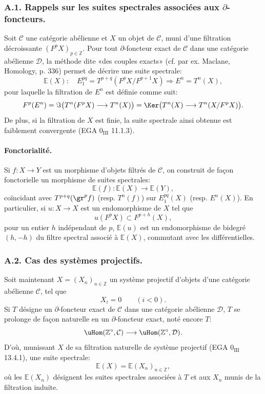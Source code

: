 \subsubsection*{A.1. Rappels sur les suites spectrales associées aux \(\partial\)-foncteurs.}

Soit \(\mathcal{C}\) une catégorie abélienne et \(X\) un objet de \(\mathcal{C}\), muni d'une filtration décroissante \((F^pX)_{p\in\mathbb{Z}}\). Pour tout \(\partial\)-foncteur exact de \(\mathcal{C}\) dans une catégorie abélienne \(\mathcal{D}\), la méthode dite «des couples exacts» (cf. par ex. Maclane, Homology, p. 336) permet de décrire une suite spectrale:
\[
\mathbb{E}(X):\quad E_1^{pq}=T^{p+q}(F^pX/F^{p+1}X)\Rightarrow E^n=T^n(X),
\]
pour laquelle la filtration de \(E^n\) est définie comme suit:
\[
F^p(E^n)=\Im\bigl(T^n(F^pX)\longrightarrow T^n(X)\bigr)
=\Ker\bigl(T^n(X)\longrightarrow T^n(X/F^pX)\bigr).
\]
De plus, si la filtration de \(X\) est finie, la suite spectrale ainsi obtenue est faiblement convergente (EGA \(0_{\mathrm{III}}\) 11.1.3).

\paragraph{Fonctorialité.}
Si \(f:X\to Y\) est un morphisme d'objets filtrés de \(\mathcal{C}\), on construit de façon fonctorielle un morphisme de suites spectrales:
\[
\mathbb{E}(f):\mathbb{E}(X)\longrightarrow \mathbb{E}(Y),
\]
coïncidant avec \(T^{p+q}(\gr^p f)\) (resp. \(T^n(f)\)) sur \(E_1^{pq}(X)\) (resp. \(E^n(X)\)). En particulier, si \(u:X\to X\) est un endomorphisme de \(X\) tel que
\[
u(F^pX)\subset F^{p+h}(X),
\]
pour un entier \(h\) indépendant de \(p\), \(\mathbb{E}(u)\) est un endomorphisme de bidegré \((h,-h)\) du filtre spectral associé à \(\mathbb{E}(X)\), commutant avec les différentielles.

\subsubsection*{A.2. Cas des systèmes projectifs.}
Soit maintenant \(X=(X_n)_{n\in\mathbb{Z}}\) un système projectif d'objets d'une catégorie abélienne \(\mathcal{C}\), tel que
\[
X_i=0\qquad(i<0).
\]
Si \(T\) désigne un \(\partial\)-foncteur exact de \(\mathcal{C}\) dans une catégorie abélienne \(\mathcal{D}\), \(T\) se prolonge de façon naturelle en un \(\partial\)-foncteur exact, noté encore \(T\):
\[
\uHom(\mathbb{Z}^\circ,\mathcal{C})\longrightarrow \uHom(\mathbb{Z}^\circ,\mathcal{D}).
\]
D'où, munissant \(X\) de sa filtration naturelle de système projectif (EGA \(0_{\mathrm{III}}\) 13.4.1), une suite spectrale:
\[
\mathbb{E}(X)=\mathbb{E}(X_n)_{n\in\mathbb{Z}},
\]
où les \(\mathbb{E}(X_n)\) désignent les suites spectrales associées à \(T\) et aux \(X_n\) munis de la filtration induite.

